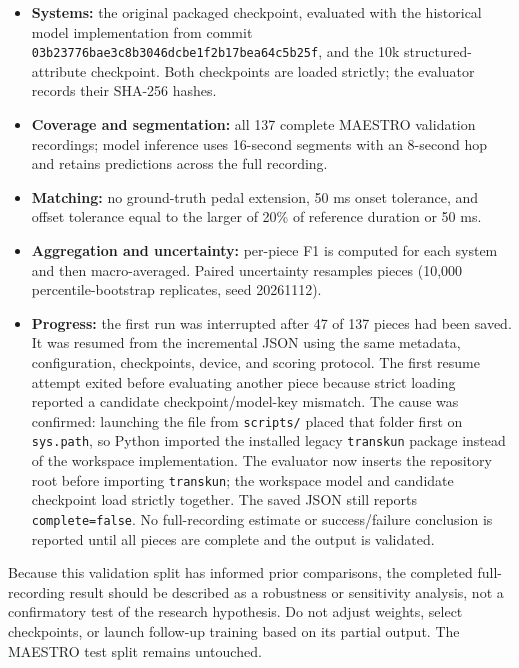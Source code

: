 \documentclass[11pt]{article}
\begin{document}
\begin{itemize}
  \item \textbf{Systems:} the original packaged checkpoint, evaluated with
        the historical model implementation from commit
        \texttt{03b23776bae3c8b3046dcbe1f2b17bea64c5b25f}, and the 10k
        structured-attribute checkpoint. Both checkpoints are loaded
        strictly; the evaluator records their SHA-256 hashes.
  \item \textbf{Coverage and segmentation:} all 137 complete MAESTRO
        validation recordings; model inference uses 16-second segments
        with an 8-second hop and retains predictions across the full
        recording.
  \item \textbf{Matching:} no ground-truth pedal extension, 50 ms onset
        tolerance, and offset tolerance equal to the larger of 20\% of
        reference duration or 50 ms.
  \item \textbf{Aggregation and uncertainty:} per-piece F1 is computed for
        each system and then macro-averaged. Paired uncertainty resamples
        pieces (10,000 percentile-bootstrap replicates, seed 20261112).
  \item \textbf{Progress:} the first run was interrupted after 47 of 137
        pieces had been saved. It was resumed from the incremental JSON
        using the same metadata, configuration, checkpoints, device, and
        scoring protocol. The first resume attempt exited before evaluating
        another piece because strict loading reported a candidate
        checkpoint/model-key mismatch. The cause was confirmed: launching
        the file from \texttt{scripts/} placed that folder first on
        \texttt{sys.path}, so Python imported the installed legacy
        \texttt{transkun} package instead of the workspace implementation.
        The evaluator now inserts the repository root before importing
        \texttt{transkun}; the workspace model and candidate checkpoint
        load strictly together. The saved JSON still reports
        \texttt{complete=false}. No full-recording estimate or
        success/failure conclusion is reported until all pieces are
        complete and the output is validated.
\end{itemize}

Because this validation split has informed prior comparisons, the completed
full-recording result should be described as a robustness or sensitivity
analysis, not a confirmatory test of the research hypothesis. Do not adjust
weights, select checkpoints, or launch follow-up training based on its
partial output. The MAESTRO test split remains untouched.
\end{document}
